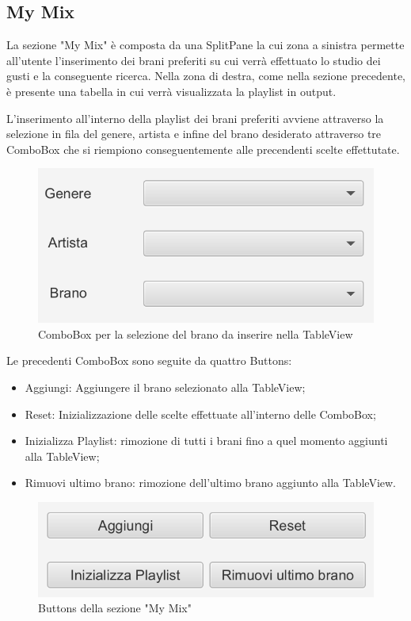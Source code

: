 \documentclass[12pt, a4paper]{article}
\begin{document}
\newpage 
\subsection{My Mix}

La sezione "My Mix" è composta da una SplitPane la cui zona a sinistra permette all'utente l'inserimento dei brani preferiti su cui verrà effettuato lo studio dei gusti e la conseguente ricerca. Nella zona di destra, come nella sezione precedente, è presente una tabella in cui verrà visualizzata la playlist in output.

L'inserimento all'interno della playlist dei brani preferiti avviene attraverso la selezione in fila del genere, artista e infine del brano desiderato attraverso tre ComboBox che si riempiono conseguentemente alle precendenti scelte effettutate.

 \begin{figure}[h]
  \centering
  \includegraphics[width=0.6\linewidth]{images/mymix_combobox.png}
  \caption{ComboBox per la selezione del brano da inserire nella TableView}
\end{figure}

Le precedenti ComboBox sono seguite da quattro Buttons:
\begin{itemize}
\item Aggiungi: Aggiungere il brano selezionato alla TableView;
\item Reset: Inizializzazione delle scelte effettuate all'interno delle ComboBox;
\item Inizializza Playlist: rimozione di tutti i brani fino a quel momento aggiunti alla TableView;
\item Rimuovi ultimo brano: rimozione dell'ultimo brano aggiunto alla TableView.
\end{itemize}

 \begin{figure}[h]
  \centering
  \includegraphics[width=0.6\linewidth]{images/mymix_buttons.png}
  \caption{Buttons della sezione "My Mix"}
\end{figure}
\end{document}
